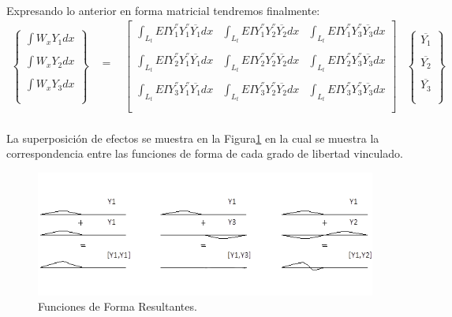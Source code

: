 \documentclass[letterpaper,oneside,12pt]{report}
\begin{document}
\paragraph{} Expresando lo anterior en forma matricial tendremos finalmente:
$$\begin{array}{cccc}
 \begin{Bmatrix}
\int{W_{x}Y_{1}dx}\\\\
\int{W_{x}Y_{2}dx}\\\\
\int{W_{x}Y_{3}dx}\\\\
\end{Bmatrix} & \begin{array}{c} \\=\\ \\ \end{array} & \begin{bmatrix} 
\int_{L_{t}}{EIY_{1}^{''}Y_{1}^{''}\overline{Y_{1}}dx} & \int_{L_{t}}{EIY_{1}^{''}Y_{2}^{''}\overline{Y_{2}}dx} & \int_{L_{t}}{EIY_{1}^{''}Y_{3}^{''}\overline{Y_{3}}dx} \\\\
\int_{L_{t}}{EIY_{2}^{''}Y_{1}^{''}\overline{Y_{1}}dx} & \int_{L_{t}}{EIY_{2}^{''}Y_{2}^{''}\overline{Y_{2}}dx} & \int_{L_{t}}{EIY_{2}^{''}Y_{3}^{''}\overline{Y_{3}}dx} \\\\
\int_{L_{t}}{EIY_{3}^{''}Y_{1}^{''}\overline{Y_{1}}dx} & \int_{L_{t}}{EIY_{3}^{''}Y_{2}^{''}\overline{Y_{2}}dx} & \int_{L_{t}}{EIY_{3}^{''}Y_{3}^{''}\overline{Y_{3}}dx} \\\\ \end{bmatrix} & \begin{Bmatrix} 
\overline{Y_{1}} \\\\
\overline{Y_{2}} \\\\
\overline{Y_{3}} \\\\
\end{Bmatrix}
\end{array}$$
\paragraph{} La superposici\'on de efectos se muestra en la Figura\ref{fig:fig2} en la cual se muestra la correspondencia entre las funciones de forma de cada grado de libertad vinculado.
\begin{figure}[htbp]
	\centering
		\includegraphics[scale=0.8]{fig2.png}
	\caption{Funciones de Forma Resultantes.}
	\label{fig:fig2}
\end{figure}
\end{document}
